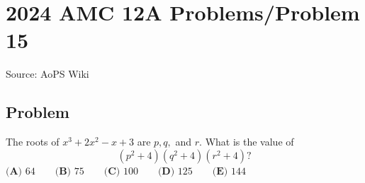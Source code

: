 \documentclass[12pt]{article}
\begin{document}
\section*{{2024 AMC 12A Problems/Problem 15}}
Source: AoPS Wiki

\subsection*{Problem}
The roots of $x^3 + 2x^2 - x + 3$ are $p, q,$ and $r.$ What is the value of \[(p^2 + 4)(q^2 + 4)(r^2 + 4)?\] $\textbf{(A) } 64 \qquad \textbf{(B) } 75 \qquad \textbf{(C) } 100 \qquad \textbf{(D) } 125 \qquad \textbf{(E) } 144$
\end{document}

